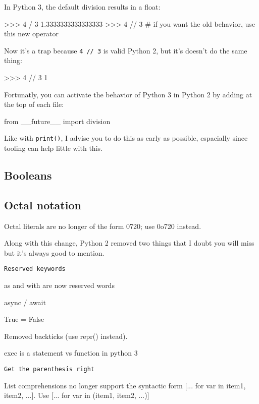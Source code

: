 In Python 3, the default division results in a float:

\begin{py3}
>>> 4 / 3
1.3333333333333333
>>> 4 // 3  # if you want the old behavior, use this new operator
\end{py3}

Now it's a trap because \lstinline{4 // 3} is valid Python 2, but it's doesn't do the same thing:

\begin{py2}
>>> 4 // 3
1
\end{py2}

Fortunatly, you can activate the behavior of Python 3 in Python 2 by adding at the top of each file:

\begin{py2and3}
from __future__ import division
\end{py2and3}

Like with \lstinline{print()}, I advise you to do this as early as possible, espacially since tooling can help little with this.

\subsection{Booleans}

\subsection{Octal notation}

Octal literals are no longer of the form 0720; use 0o720 instead.


Along with this change, Python 2 removed two things that I doubt you will miss but it's always good to mention.

\lstinline{Reserved keywords}

as and with are now reserved words

async / await

True = False

Removed backticks (use repr() instead).

exec is a statement vs function in python 3




\lstinline{Get the parenthesis right}

List comprehensions no longer support the syntactic form [... for var in item1, item2, ...]. Use [... for var in (item1, item2, ...)]

